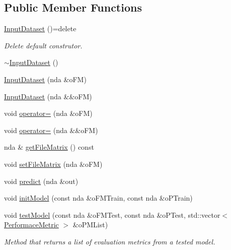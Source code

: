\subsection*{Public Member Functions}
\begin{DoxyCompactItemize}
\item 
\mbox{\label{classmodel__api_1_1InputDataset_a410e07ea3fe528370ff45f7e1833f5ec}} 
\hyperlink{classmodel__api_1_1InputDataset_a410e07ea3fe528370ff45f7e1833f5ec}{Input\+Dataset} ()=delete
\begin{DoxyCompactList}\small\item\em Delete default construtor. \end{DoxyCompactList}\item 
\hyperlink{classmodel__api_1_1InputDataset_a31f12b83db2195f609dfc8af27cdbc58}{$\sim$\+Input\+Dataset} ()
\item 
\hyperlink{classmodel__api_1_1InputDataset_a5fd9fc18bbd147d612acb16a808a135c}{Input\+Dataset} (nda \&o\+FM)
\item 
\hyperlink{classmodel__api_1_1InputDataset_a213885343387992b05a173ecb70a628f}{Input\+Dataset} (nda \&\&o\+FM)
\item 
void \hyperlink{classmodel__api_1_1InputDataset_a59c9f5a14675794a67ef0eafa7550d8d}{operator=} (nda \&o\+FM)
\item 
void \hyperlink{classmodel__api_1_1InputDataset_a192c20a95f93e03b4c4adb07e8e5e077}{operator=} (nda \&\&o\+FM)
\item 
nda \& \hyperlink{classmodel__api_1_1InputDataset_a853b380f548e21ee7421f887b9be2722}{get\+File\+Matrix} () const
\item 
void \hyperlink{classmodel__api_1_1InputDataset_a71111535a17422db1f0fdbe2ac6ce1c8}{set\+File\+Matrix} (nda \&o\+FM)
\item 
void \hyperlink{classmodel__api_1_1InputDataset_af25824b44f866ff2b03e5d1036d7215a}{predict} (nda \&out)
\item 
void \hyperlink{classmodel__api_1_1InputDataset_af7d130afc8889825573e738906397714}{init\+Model} (const nda \&o\+F\+M\+Train, const nda \&o\+P\+Train)
\item 
void \hyperlink{classmodel__api_1_1InputDataset_a0829ebb09eca7632e7032f40d451c70d}{test\+Model} (const nda \&o\+F\+M\+Test, const nda \&o\+P\+Test, std\+::vector$<$ \hyperlink{structPerformaceMetric}{Performace\+Metric} $>$ \&o\+P\+M\+List)
\begin{DoxyCompactList}\small\item\em Method that returns a list of evaluation metrics from a tested model. \end{DoxyCompactList}\end{DoxyCompactItemize}

